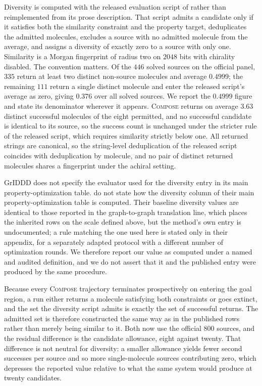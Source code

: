 \documentclass{article}
\theoremstyle{definition}
\theoremstyle{remark}
\newcommand{\method}{\textsc{Compose}\xspace}
\begin{document}
Diversity is computed with the released evaluation script of \citet{jin2019vjtnn} rather than reimplemented from its prose description. That script admits a candidate only if it satisfies both the similarity constraint and the property target, deduplicates the admitted molecules, excludes a source with no admitted molecule from the average, and assigns a diversity of exactly zero to a source with only one. Similarity is a Morgan fingerprint of radius two on $2048$ bits with chirality disabled. The convention matters. Of the $446$ solved sources on the official panel, $335$ return at least two distinct non-source molecules and average $0.4999$; the remaining $111$ return a single distinct molecule and enter the released script's average as zero, giving $0.376$ over all solved sources. We report the $0.4999$ figure and state its denominator wherever it appears. \method{} returns on average $3.63$ distinct successful molecules of the eight permitted, and no successful candidate is identical to its source, so the success count is unchanged under the stricter rule of the released script, which requires similarity strictly below one. All returned strings are canonical, so the string-level deduplication of the released script coincides with deduplication by molecule, and no pair of distinct returned molecules shares a fingerprint under the achiral setting.

GrIDDD does not specify the evaluator used for the diversity entry in its main property-optimization table. \citet{ninniri2025griddd} do not state how the diversity column of their main property-optimization table is computed. Their baseline diversity values are identical to those reported in the graph-to-graph translation line, which places the inherited rows on the scale defined above, but the method's own entry is undocumented; a rule matching the one used here is stated only in their appendix, for a separately adapted protocol with a different number of optimization rounds. We therefore report our value as computed under a named and audited definition, and we do not assert that it and the published entry were produced by the same procedure.

Because every \method{} trajectory terminates prospectively on entering the goal region, a run either returns a molecule satisfying both constraints or goes extinct, and the set the diversity script admits is exactly the set of successful returns. The admitted set is therefore constructed the same way as in the published rows rather than merely being similar to it. Both now use the official $800$ sources, and the residual difference is the candidate allowance, eight against twenty. That difference is not neutral for diversity: a smaller allowance yields fewer second successes per source and so more single-molecule sources contributing zero, which depresses the reported value relative to what the same system would produce at twenty candidates.
\end{document}
